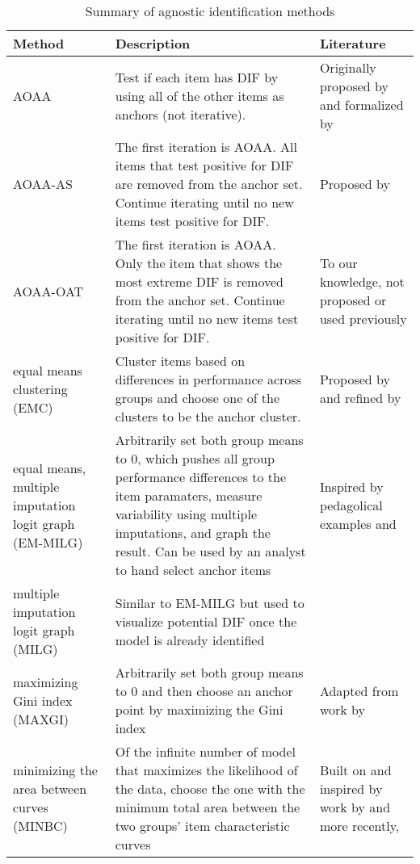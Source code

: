 \documentclass[
  11pt,
]{article}
\begin{document}
{
\setcounter{tocdepth}{5}
\tableofcontents
}
\begin{table}[H]
\caption{Summary of agnostic identification methods}
\centering
\begin{tabular}{|p{4cm}|p{6cm}|p{4cm}|}
\toprule

Method & Description & Literature \\

\midrule

AOAA & Test if each item has DIF by using all of the other items as anchors (not iterative). & Originally proposed by \cite{lord1980} and formalized by \cite{thissen1993detection} \\\hline

AOAA-AS & The first iteration is AOAA. All items that test positive for DIF are removed from the anchor set. Continue iterating until no new items test positive for DIF. & Proposed by \cite{drasgow1987study} \\\hline

AOAA-OAT & The first iteration is AOAA. Only the item that shows the most extreme DIF is removed from the anchor set. Continue iterating until no new items test positive for DIF. & To our knowledge, not proposed or used previously \\

equal means clustering (EMC) & Cluster items based on differences in performance across groups and choose one of the clusters to be the anchor cluster. & Proposed by \cite{bechger2015statistical} and refined by \cite{pohl2017cluster} \\\hline

equal means, multiple imputation logit graph (EM-MILG) & Arbitrarily set both group means to 0, which pushes all group performance differences to the item paramaters, measure variability using multiple imputations, and graph the result. Can be used by an analyst to hand select anchor items & Inspired by pedagolical examples \cite{pohl2017cluster} and \cite{talbot2013taking} \\\hline

multiple imputation logit graph (MILG) & Similar to EM-MILG but used to visualize potential DIF once the model is already identified &  \\\hline

maximizing Gini index (MAXGI) & Arbitrarily set both group means to 0 and then choose an anchor point by maximizing the Gini index & Adapted from work by \cite{strobl2018anchor} \\\hline

minimizing the area between curves (MINBC) & Of the infinite number of model that maximizes the likelihood of the data, choose the one with the minimum total area between the two groups' item characteristic curves & Built on and inspired by work by \cite{raju1988area} and more recently, \cite{chalmers2016might} \\

\bottomrule
\end{tabular}
\label{table:allmethods}
\end{table}



\end{document}
